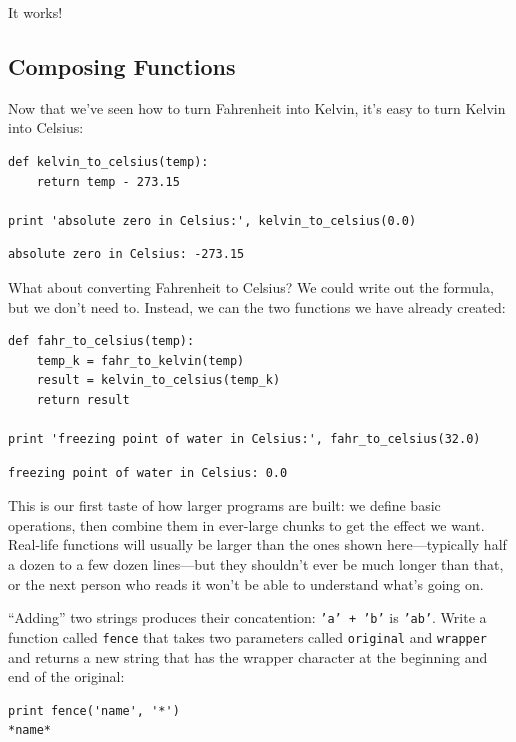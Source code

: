 \documentclass{book}
\begin{document}
It works!

\subsection{Composing Functions}

Now that we've seen how to turn Fahrenheit into Kelvin, it's easy to
turn Kelvin into Celsius:

\begin{verbatim}
def kelvin_to_celsius(temp):
    return temp - 273.15

print 'absolute zero in Celsius:', kelvin_to_celsius(0.0)
\end{verbatim}

\begin{verbatim}
absolute zero in Celsius: -273.15
\end{verbatim}

What about converting Fahrenheit to Celsius? We could write out the
formula, but we don't need to. Instead, we can
 the two functions we have
already created:

\begin{verbatim}
def fahr_to_celsius(temp):
    temp_k = fahr_to_kelvin(temp)
    result = kelvin_to_celsius(temp_k)
    return result

print 'freezing point of water in Celsius:', fahr_to_celsius(32.0)
\end{verbatim}

\begin{verbatim}
freezing point of water in Celsius: 0.0
\end{verbatim}

This is our first taste of how larger programs are built: we define
basic operations, then combine them in ever-large chunks to get the
effect we want. Real-life functions will usually be larger than the ones
shown here---typically half a dozen to a few dozen lines---but they
shouldn't ever be much longer than that, or the next person who reads it
won't be able to understand what's going on.

\begin{challenge}
  ``Adding'' two strings produces their concatention: \texttt{'a' + 'b'}
  is \texttt{'ab'}. Write a function called \texttt{fence} that takes
  two parameters called \texttt{original} and \texttt{wrapper} and
  returns a new string that has the wrapper character at the beginning
  and end of the original:

\begin{verbatim}
print fence('name', '*')
*name*
\end{verbatim}
\end{challenge}
\end{document}
